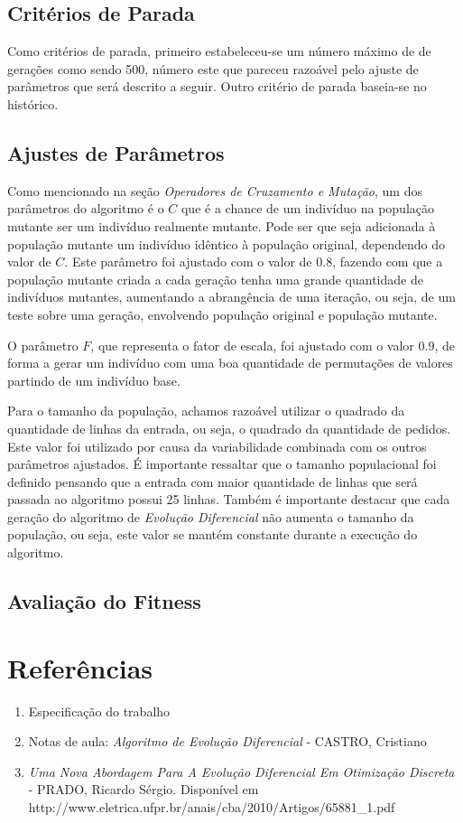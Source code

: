 \documentclass[12pt]{elsarticle}
\begin{document}
	\subsection{Critérios de Parada}
	Como critérios de parada, primeiro estabeleceu-se um número máximo de de gerações como sendo 500, número este que pareceu razoável pelo ajuste de parâmetros que será descrito a seguir. Outro critério de parada baseia-se no histórico. %
	
	\subsection{Ajustes de Parâmetros}
	Como mencionado na seção \textit{Operadores de Cruzamento e Mutação}, um dos parâmetros do algoritmo é o $C$ que é a chance de um indivíduo na população mutante ser um indivíduo realmente mutante. Pode ser que seja adicionada à população mutante um indivíduo idêntico à população original, dependendo do valor de $C$. Este parâmetro foi ajustado com o valor de $0.8$, fazendo com que a população mutante criada a cada geração tenha uma grande quantidade de indivíduos mutantes, aumentando a abrangência de uma iteração, ou seja, de um teste sobre uma geração, envolvendo população original e população mutante.
	
	O parâmetro $F$, que representa o fator de escala, foi ajustado com o valor $0.9$, de forma a gerar um indivíduo com uma boa quantidade de permutações de valores partindo de um indivíduo base.
	
	Para o tamanho da população, achamos razoável utilizar o quadrado da quantidade de linhas da entrada, ou seja, o quadrado da quantidade de pedidos. Este valor foi utilizado por causa da variabilidade combinada com os outros parâmetros ajustados. É importante ressaltar que o tamanho populacional foi definido pensando que a entrada com maior quantidade de linhas que será passada ao algoritmo possui 25 linhas. Também é importante destacar que cada geração do algoritmo de \textit{Evolução Diferencial} não aumenta o tamanho da população, ou seja, este valor se mantém constante durante a execução do algoritmo.
	
	\subsection{Avaliação do Fitness}
	
	\section{Referências}
	\begin{enumerate}
		\item Especificação do trabalho
		\item Notas de aula: \textit{Algoritmo de Evolução Diferencial} - CASTRO, Cristiano
		\item \textit{Uma Nova Abordagem Para A Evolução Diferencial Em Otimização Discreta} - PRADO, Ricardo Sérgio. Disponível em http://www.eletrica.ufpr.br/anais/cba/2010/Artigos/65881\_1.pdf
	\end{enumerate}
	
\end{document}
